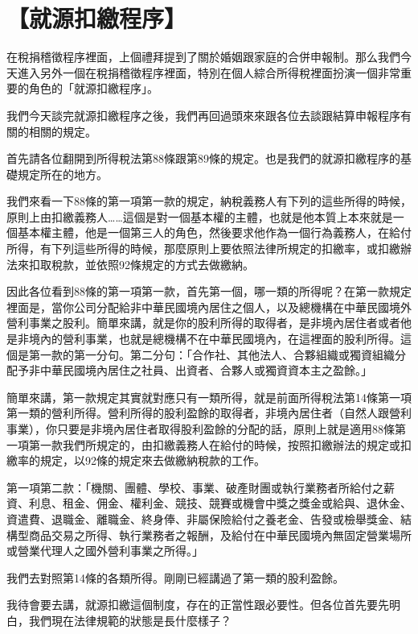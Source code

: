 \documentclass[]{ctexbook}
\begin{document}
\hypertarget{ux5c31ux6e90ux6263ux7e73ux7a0bux5e8f}{%
\section{【就源扣繳程序】}\label{ux5c31ux6e90ux6263ux7e73ux7a0bux5e8f}}

在稅捐稽徵程序裡面，上個禮拜提到了關於婚姻跟家庭的合併申報制。那么我們今天進入另外一個在稅捐稽徵程序裡面，特別在個人綜合所得稅裡面扮演一個非常重要的角色的「就源扣繳程序」。

我們今天談完就源扣繳程序之後，我們再回過頭來來跟各位去談跟結算申報程序有關的相關的規定。

首先請各位翻開到所得稅法第88條跟第89條的規定。也是我們的就源扣繳程序的基礎規定所在的地方。

我們來看一下88條的第一項第一款的規定，納稅義務人有下列的這些所得的時候，原則上由扣繳義務人\ldots\ldots 這個是對一個基本權的主體，也就是他本質上本來就是一個基本權主體，他是一個第三人的角色，然後要求他作為一個行為義務人，在給付所得，有下列這些所得的時候，那麼原則上要依照法律所規定的扣繳率，或扣繳辦法來扣取稅款，並依照92條規定的方式去做繳納。

因此各位看到88條的第一項第一款，首先第一個，哪一類的所得呢？在第一款規定裡面是，當你公司分配給非中華民國境內居住之個人，以及總機構在中華民國境外營利事業之股利。簡單來講，就是你的股利所得的取得者，是非境內居住者或者他是非境內的營利事業，也就是總機構不在中華民國境內，在這裡面的股利所得。這個是第一款的第一分句。第二分句：「合作社、其他法人、合夥組織或獨資組織分配予非中華民國境內居住之社員、出資者、合夥人或獨資資本主之盈餘。」

簡單來講，第一款規定其實就對應只有一類所得，就是前面所得稅法第14條第一項第一類的營利所得。營利所得的股利盈餘的取得者，非境內居住者（自然人跟營利事業），你只要是非境內居住者取得股利盈餘的分配的話，原則上就是適用88條第一項第一款我們所規定的，由扣繳義務人在給付的時候，按照扣繳辦法的規定或扣繳率的規定，以92條的規定來去做繳納稅款的工作。

第一項第二款：「機關、團體、學校、事業、破產財團或執行業務者所給付之薪資、利息、租金、佣金、權利金、競技、競賽或機會中獎之獎金或給與、退休金、資遣費、退職金、離職金、終身俸、非屬保險給付之養老金、告發或檢舉獎金、結構型商品交易之所得、執行業務者之報酬，及給付在中華民國境內無固定營業場所或營業代理人之國外營利事業之所得。」

我們去對照第14條的各類所得。剛剛已經講過了第一類的股利盈餘。

我待會要去講，就源扣繳這個制度，存在的正當性跟必要性。但各位首先要先明白，我們現在法律規範的狀態是長什麼樣子？
\end{document}
